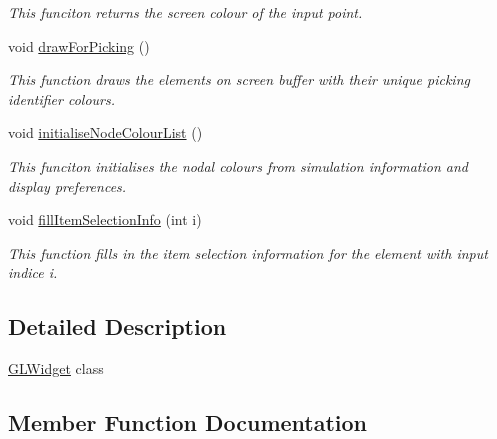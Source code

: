 \begin{DoxyCompactItemize}
\begin{DoxyCompactList}\small\item\em This funciton returns the screen colour of the input point. \end{DoxyCompactList}\item 
\hypertarget{classGLWidget_a218fadfeda519fd8a120b702f04771c8}{}void \hyperlink{classGLWidget_a218fadfeda519fd8a120b702f04771c8}{draw\+For\+Picking} ()\label{classGLWidget_a218fadfeda519fd8a120b702f04771c8}

\begin{DoxyCompactList}\small\item\em This function draws the elements on screen buffer with their unique picking identifier colours. \end{DoxyCompactList}\item 
\hypertarget{classGLWidget_a30be9e529d717552be70cbad097d99e8}{}void \hyperlink{classGLWidget_a30be9e529d717552be70cbad097d99e8}{initialise\+Node\+Colour\+List} ()\label{classGLWidget_a30be9e529d717552be70cbad097d99e8}

\begin{DoxyCompactList}\small\item\em This funciton initialises the nodal colours from simulation information and display preferences. \end{DoxyCompactList}\item 
\hypertarget{classGLWidget_af2ce64f5342b0a42f9460a9173b7eaf7}{}void \hyperlink{classGLWidget_af2ce64f5342b0a42f9460a9173b7eaf7}{fill\+Item\+Selection\+Info} (int i)\label{classGLWidget_af2ce64f5342b0a42f9460a9173b7eaf7}

\begin{DoxyCompactList}\small\item\em This function fills in the item selection information for the element with input indice i. \end{DoxyCompactList}\end{DoxyCompactItemize}


\subsection{Detailed Description}
\hyperlink{classGLWidget}{G\+L\+Widget} class 

\subsection{Member Function Documentation}
\hypertarget{classGLWidget_a7fab13e8cc9fc0730ca54c08b2c923a7}{}
